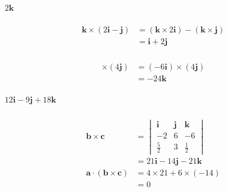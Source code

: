 \documentclass{article}
\begin{document}
\setcounter{subsubsection}{18}
\subsubsection{}

$2 \mathbf{k}$

\setcounter{subsubsection}{20}
\subsubsection{}

\begin{align*}
  \mathbf{k} \times (2 \mathbf{i} - \mathbf{j}) & = (\mathbf{k} \times 2 \mathbf{i}) - (\mathbf{k} \times \mathbf{j}) \\
                                                & = \mathbf{i} + 2 \mathbf{j}
\end{align*}

\setcounter{subsubsection}{22}
\subsubsection{}

\begin{align*}
  [(2 \mathbf{k}) \times (3 \mathbf{j})] \times (4 \mathbf{j}) & = (-6 \mathbf{i}) \times (4 \mathbf{j}) \\
                                                               & = -24 \mathbf{k}
\end{align*}

\setcounter{subsubsection}{36}
\subsubsection{}

$12 \mathbf{i} - 9 \mathbf{j} + 18 \mathbf{k}$

\setcounter{subsubsection}{52}
\subsubsection{}

\begin{align*}
  \mathbf{b} \times \mathbf{c}                    & = \begin{vmatrix}
                                                        \mathbf{i}  & \mathbf{j} & \mathbf{k}  \\
                                                        -2          & 6          & -6          \\
                                                        \frac{5}{2} & 3          & \frac{1}{2}
                                                      \end{vmatrix}        \\
                                                  & = 21 \mathbf{i} - 14 \mathbf{j} - 21 \mathbf{k} \\
  \mathbf{a} \cdot (\mathbf{b} \times \mathbf{c}) & = 4 \times 21 + 6 \times (-14)                  \\
                                                  & = 0
\end{align*}
\end{document}
